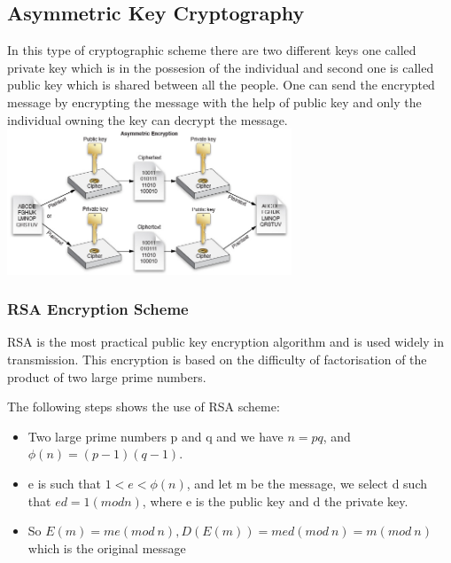 \documentclass[conference]{IEEEtran}
\begin{document}
\subsection{Asymmetric Key Cryptography}
\begin{flushleft}
In this type of cryptographic scheme there are two different keys one called private key which is in the possesion of the individual and second one is called public key which is shared between all the people. One can send the encrypted message by encrypting the message with the help of public key and only the individual owning the key can decrypt the message.
\includegraphics[width=8.5cm]{asymmetric}

\end{flushleft}

\subsubsection{RSA Encryption Scheme}
\begin{flushleft}
RSA is the most practical public key encryption algorithm and is used widely in transmission. This encryption is based on the difficulty of factorisation of the product of two large prime numbers.

The following steps shows the use of RSA scheme:
\begin{itemize}
  \item Two large prime numbers p and q and we have \(n = pq \), and \(\phi(n) = (p-1)(q-1)\).
  \item e is such that \(1 < e < \phi(n)\), and let m be the message, we select d such that \(ed = 1 (mod n)\), where e is the public key and d the private key.
  \item So \(E(m) = me  (mod\ n), D(E(m)) = med (mod\ n) = m (mod\ n)\) which is the original message
\end{itemize}

\end{flushleft}
\end{document}

